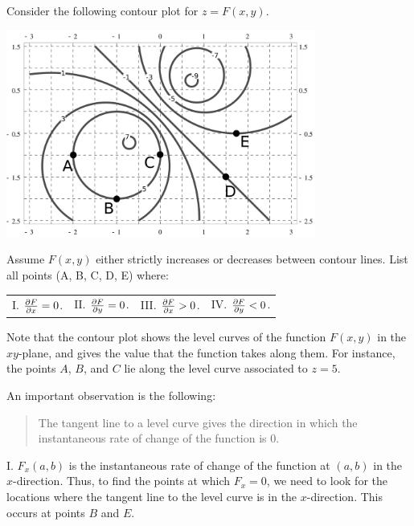 \documentclass[noauthor,handout]{ximera}
\begin{document}

\begin{problem}
Consider the following contour plot for $z=F(x,y)$.
\begin{image}
\includegraphics[width=4in]{contours1.png}
\end{image}
Assume $F(x,y)$ either strictly increases or decreases between contour lines.  List all points (\textsf{A}, \textsf{B}, \textsf{C}, \textsf{D},
\textsf{E}) where:

\begin{center}
\begin{tabular}{llll}
I. $\pp[F]{x}=0$.  \qquad \qquad &II. $\pp[F]{y}=0$. \qquad \qquad &III. $\pp[F]{x}>0$. \qquad \qquad &IV. $\pp[F]{y}<0$.
\end{tabular}
\end{center}

\begin{freeResponse}
Note that the contour plot shows the level curves of the function $F(x,y)$ in the $xy$-plane, and gives the value that the function takes along them.  For instance, the points $A$, $B$, and $C$ lie along the level curve associated to $z=5$.

An important observation is the following:

\begin{quote}
The tangent line to a level curve gives the direction in which the instantaneous rate of change of the function is $0$.
\end{quote}

I. $F_x(a,b)$ is the instantaneous rate of change of the function at $(a,b)$ in the $x$-direction.  Thus, to find the points at which $F_x=0$, we need to look for the locations where the tangent line to the level curve is in the $x$-direction.  This occurs at points $B$ and $E$.


\end{freeResponse}
\end{problem}
\end{document}
